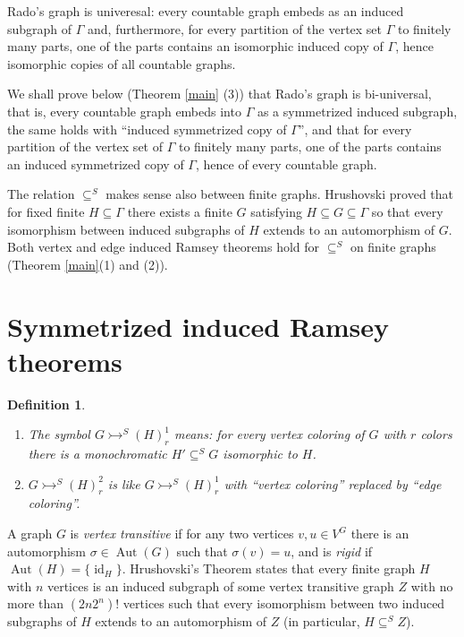 \documentclass[11pt]{amsart}
\newcommand{\ars}{\rightarrowtail}
\newcommand{\su}{\subseteq}
\newcommand{\aut}{\operatorname{Aut}}
\newcommand{\id}{\operatorname{id}}
\newtheorem{definition}[theorem]{Definition}
\begin{document}
Rado's graph is univeresal: every countable graph embeds as an induced
subgraph of $\Gamma$ and, furthermore, for every partition of the
vertex set $\Gamma$ to finitely many parts, one of the parts contains
an isomorphic induced copy of $\Gamma$, hence isomorphic copies of all
countable graphs.


We shall prove below (Theorem \ref{main} (3)) that Rado's graph is
  bi-universal, that is, every countable graph embeds into $\Gamma$ as
  a symmetrized induced subgraph, the same holds with ``induced
  symmetrized copy of $\Gamma$'', and that for every partition of the
  vertex set of $\Gamma$ to finitely many parts, one of the parts
  contains an induced symmetrized copy of $\Gamma$, hence of every
  countable graph.



The relation $\su^S$ makes sense also between finite graphs.
Hrushovski \cite{H} proved that for fixed finite $H\su \Gamma$ there
exists a finite $G$ satisfying $H\su G\su \Gamma$ so that every
isomorphism between induced subgraphs of $H$ extends to an
automorphism of $G$. Both vertex and edge induced Ramsey theorems hold
for $\su^S$ on finite graphs (Theorem \ref{main}(1) and (2)). 






\section{Symmetrized induced Ramsey theorems}


\begin{definition}
\begin{enumerate}
\item The symbol $G\ars^S (H)^1_r$ means: for every \emph{vertex
    coloring} of $G$ with $r$ colors there is a monochromatic $H'\su^S
  G$ isomorphic to $H$.
  \item $G\ars^S(H)^2_r$ is like  $G\ars^S (H)^1_r$ with
  ``vertex coloring''    replaced by \emph{``edge coloring''}.
\end{enumerate}
\end{definition}


A graph $G$ is \emph{vertex transitive} if for any two vertices
$v,u\in V^G$ there is an automorphism $\sigma \in \aut (G)$ such that
$\sigma(v)=u$, and is \emph{rigid} if $\aut(H)=\{\id_H\}$.
Hrushovski's Theorem \cite{H} states that every finite graph $H$ with
$n$ vertices is an induced subgraph of some vertex transitive graph
$Z$ with no more than $(2n2^n)!$ vertices such that every isomorphism
between two induced subgraphs of $H$ extends to an automorphism of
$Z$ (in particular, $H\su^S Z$).
\end{document}
